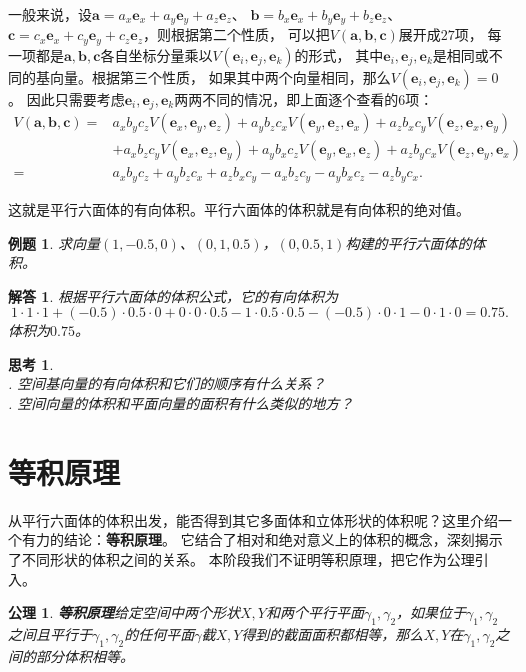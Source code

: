 \documentclass[12pt,UTF8]{ctexbook}
\newtheorem{et}{例题}[section]
\newtheorem{sk}{思考}[section]
\newtheorem{po}{公理}
\newtheorem*{so}{解答}
\begin{document}
一般来说，设$\mathbf{a} = a_x\mathbf{e}_x + a_y\mathbf{e}_y + a_z\mathbf{e}_z$、
$\mathbf{b} = b_x\mathbf{e}_x + b_y\mathbf{e}_y + b_z\mathbf{e}_z$、
$\mathbf{c} = c_x\mathbf{e}_x + c_y\mathbf{e}_y + c_z\mathbf{e}_z$，则根据第二个性质，
可以把$V(\mathbf{a},\mathbf{b},\mathbf{c})$展开成$27$项，
每一项都是$\mathbf{a},\mathbf{b},\mathbf{c}$各自坐标分量乘以$V(\mathbf{e}_i, \mathbf{e}_j, \mathbf{e}_k)$的形式，
其中$\mathbf{e}_i, \mathbf{e}_j, \mathbf{e}_k$是相同或不同的基向量。根据第三个性质，
如果其中两个向量相同，那么$V(\mathbf{e}_i, \mathbf{e}_j, \mathbf{e}_k)=0$。
因此只需要考虑$\mathbf{e}_i, \mathbf{e}_j, \mathbf{e}_k$两两不同的情况，即上面逐个查看的$6$项：
\begin{align*}
    V(\mathbf{a},\mathbf{b},\mathbf{c}) = & a_xb_yc_zV(\mathbf{e}_x, \mathbf{e}_y, \mathbf{e}_z) + a_yb_zc_xV(\mathbf{e}_y, \mathbf{e}_z, \mathbf{e}_x) + a_zb_xc_yV(\mathbf{e}_z, \mathbf{e}_x, \mathbf{e}_y) \\ 
    &+ a_xb_zc_yV(\mathbf{e}_x, \mathbf{e}_z, \mathbf{e}_y) + a_yb_xc_zV(\mathbf{e}_y, \mathbf{e}_x, \mathbf{e}_z) + a_zb_yc_xV(\mathbf{e}_z, \mathbf{e}_y, \mathbf{e}_x) \\
    = & a_xb_yc_z + a_yb_zc_x + a_zb_xc_y - a_xb_zc_y - a_yb_xc_z - a_zb_yc_x. 
\end{align*}

这就是平行六面体的有向体积。平行六面体的体积就是有向体积的绝对值。
\begin{et}
    求向量$(1,-0.5,0)$、$(0,1,0.5)$，$(0,0.5,1)$构建的平行六面体的体积。
\end{et}
\begin{so}
    根据平行六面体的体积公式，它的有向体积为
    $$ 1\cdot 1\cdot 1 + (-0.5)\cdot 0.5\cdot 0 + 0\cdot 0\cdot 0.5 - 1\cdot 0.5\cdot 0.5 - (-0.5)\cdot 0\cdot 1 - 0\cdot 1\cdot 0 = 0.75.$$
    体积为$0.75$。
\end{so}

\begin{sk}
    \mbox{} \\
    . 空间基向量的有向体积和它们的顺序有什么关系？  \\
    . 空间向量的体积和平面向量的面积有什么类似的地方？
\end{sk}

\section{等积原理}

从平行六面体的体积出发，能否得到其它多面体和立体形状的体积呢？这里介绍一个有力的结论：\textbf{等积原理}。
它结合了相对和绝对意义上的体积的概念，深刻揭示了不同形状的体积之间的关系。
本阶段我们不证明等积原理，把它作为公理引入。
\begin{po}{\textbf{等积原理}}\label{po:6}
    给定空间中两个形状$X,Y$和两个平行平面$\gamma_1,\gamma_2$，如果位于$\gamma_1,\gamma_2$之间且平行于$\gamma_1,\gamma_2$的任何平面$\gamma$截$X,Y$得到的截面面积都相等，那么$X,Y$在$\gamma_1,\gamma_2$之间的部分体积相等。
\end{po}
\end{document}
